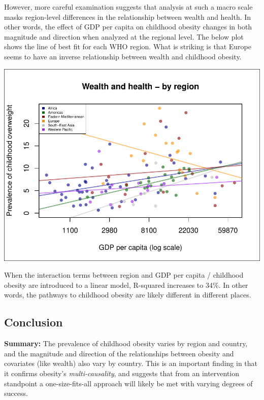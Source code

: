 \documentclass[11pt]{article}
\begin{document}
\begin{multicols}{2}
However, more careful examination suggests that analysis at such a macro scale masks region-level differences in the relationship between wealth and health.  In other words, the effect of GDP per capita on childhood obesity changes in both magnitude and direction when analyzed at the regional level.  The below plot shows the line of best fit for each WHO region.  What is striking is that Europe seems to have an inverse relationship between wealth and childhood obesity.      \\

\begin{center}
\includegraphics{global_variance-009}
\end{center}

When the interaction terms between region and GDP per capita / childhood obesity are introduced to a linear model, R-squared increases to 34\%.  In other words, the pathways to childhood obesity are likely different in different places.

\subsection*{Conclusion}

\noindent \textbf{Summary:} The prevalence of childhood obesity varies by region and country, and the magnitude and direction of the relationships between obesity and covariates (like wealth) also vary by country.  This is an important finding in that it confirms obesity's \emph{multi-causality}, and suggests that from an intervention standpoint a one-size-fits-all approach will likely be met with varying degrees of success. \\


\end{multicols}
\end{document}
